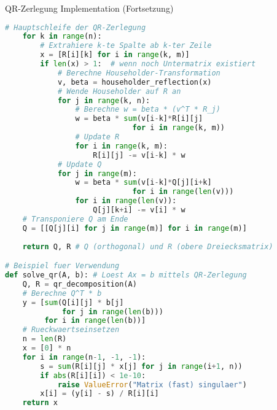 \begin{examplecode}{QR-Zerlegung Implementation (Fortsetzung)}
\begin{lstlisting}[language=Python, style=basesmol]
    # Hauptschleife der QR-Zerlegung
    for k in range(n):
        # Extrahiere k-te Spalte ab k-ter Zeile
        x = [R[i][k] for i in range(k, m)]
        if len(x) > 1:  # wenn noch Untermatrix existiert
            # Berechne Householder-Transformation
            v, beta = householder_reflection(x)
            # Wende Householder auf R an
            for j in range(k, n):
                # Berechne w = beta * (v^T * R_j)
                w = beta * sum(v[i-k]*R[i][j] 
                             for i in range(k, m))
                # Update R
                for i in range(k, m):
                    R[i][j] -= v[i-k] * w
            # Update Q
            for j in range(m):
                w = beta * sum(v[i-k]*Q[j][i+k] 
                             for i in range(len(v)))
                for i in range(len(v)):
                    Q[j][k+i] -= v[i] * w
    # Transponiere Q am Ende
    Q = [[Q[j][i] for j in range(m)] for i in range(m)]
    
    return Q, R # Q (orthogonal) und R (obere Dreiecksmatrix)

# Beispiel fuer Verwendung
def solve_qr(A, b): # Loest Ax = b mittels QR-Zerlegung
    Q, R = qr_decomposition(A)
    # Berechne Q^T * b
    y = [sum(Q[i][j] * b[j] 
             for j in range(len(b))) 
         for i in range(len(b))]
    # Rueckwaertseinsetzen
    n = len(R)
    x = [0] * n
    for i in range(n-1, -1, -1):
        s = sum(R[i][j] * x[j] for j in range(i+1, n))
        if abs(R[i][i]) < 1e-10:
            raise ValueError("Matrix (fast) singulaer")
        x[i] = (y[i] - s) / R[i][i]
    return x
\end{lstlisting}
\end{examplecode}


